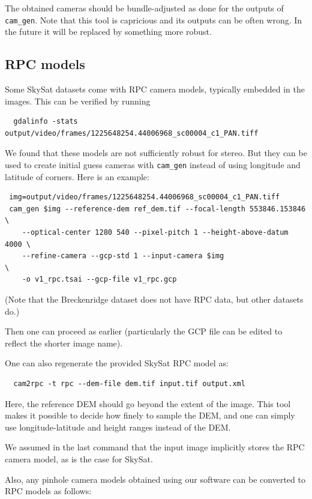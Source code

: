 The obtained cameras should be bundle-adjusted as done for the outputs
of \texttt{cam\_gen}. Note that this tool is capricious and its outputs
can be often wrong. In the future it will be replaced by something more
robust.

\subsection{RPC models}

Some SkySat datasets come with RPC camera models, typically embedded
in the images. This can be verified by running
\begin{verbatim}
  gdalinfo -stats output/video/frames/1225648254.44006968_sc00004_c1_PAN.tiff
\end{verbatim}

We found that these models are not sufficiently
robust for stereo. But they can be used to create initial guess
cameras with \texttt{cam\_gen} instead of using longitude and latitude
of corners. Here is an example:

\begin{verbatim}
 img=output/video/frames/1225648254.44006968_sc00004_c1_PAN.tiff
 cam_gen $img --reference-dem ref_dem.tif --focal-length 553846.153846  \
    --optical-center 1280 540 --pixel-pitch 1 --height-above-datum 4000 \
    --refine-camera --gcp-std 1 --input-camera $img                     \
    -o v1_rpc.tsai --gcp-file v1_rpc.gcp
\end{verbatim}
(Note that the Breckenridge dataset does not have RPC data, but other datasets do.)

Then one can proceed as earlier (particularly the GCP file can be edited
to reflect the shorter image name).

One can also regenerate the provided SkySat RPC model as:

\begin{verbatim}
  cam2rpc -t rpc --dem-file dem.tif input.tif output.xml
\end{verbatim}

Here, the reference DEM should go beyond the extent of the image.  This tool
makes it possible to decide how finely to sample the DEM, and one can
simply use longitude-latitude and height ranges instead of the DEM.

We assumed in the last command that the input image implicitly stores
the RPC camera model, as is the case for SkySat.

Also, any pinhole camera models obtained using our software 
can be converted to RPC models as follows:

